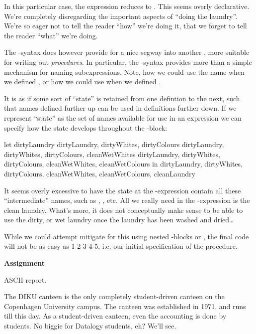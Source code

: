 In this particular case, the expression reduces to . This seems overly declarative. We're completely disregarding the
important aspects of ``doing the laundry''. We're so eager not to tell the
reader ``how'' we're doing it, that we forget to tell the reader ``what'' we're
doing.

The -syntax does however provide for a nice segway into another
, more suitable for writing out \emph{procedures}. In particular, the
-syntax provides more than a simple mechanism for naming
subexpressions. Note, how we could use the name  when we
defined , or how we could use  when we
defined .

It is as if some sort of ``state'' is retained from one defintion to the next,
such that names defined further up can be used in definitions further down. If
we represent ``state'' as the set of names available for use in an expression
we can specify how the state develops throughout the -block: 

\begin{code}
let
  {dirtyLaundry}
  {dirtyLaundry, dirtyWhites, dirtyColours}
  {dirtyLaundry, dirtyWhites, dirtyColours,
    cleanWetWhites}
  {dirtyLaundry, dirtyWhites, dirtyColours,
    cleanWetWhites, cleanWetColours}
in
  {dirtyLaundry, dirtyWhites, dirtyColours,
    cleanWetWhites, cleanWetColours, cleanLaundry}
\end{code}

It seems overly excessive to have the state at the -expression
contain all these ``intermediate'' names, such as ,
, etc. All we really need in the -expression is
the clean laundry.  What's more, it does not conceptually make sense to be able
to use the dirty, or wet laundry once the laundry has been washed and
dried\ldots 

While we could attempt mitigate for this using nested -blocks or
, the final code will not be as easy as
1-2-3-4-5, i.e. our initial specification of the procedure.




{\bf Assignment}

ASCII report.

The DIKU canteen is the only completely student-driven canteen on the
Copenhagen University campus. The canteen was established in 1971, and runs
till this day. As a student-driven canteen, even the accounting is done by
students. No biggie for Datalogy students, eh? We'll see.

